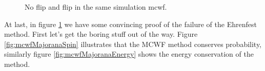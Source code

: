 \begin{figure}
\hspace{-8em}
\caption{No flip and flip in the same simulation mcwf.}\label{fig:mcwfFlip}
\end{figure}

At last, in figure \ref{fig:mcwfFlip} we have some convincing proof of the failure of the Ehrenfest method.
First let's get the boring stuff out of the way.
Figure \ref{fig:mcwfMajoranaSpin} illustrates that the MCWF method conserves probability, similarly figure \ref{fig:mcwfMajoranaEnergy} shows the energy conservation of the method.

